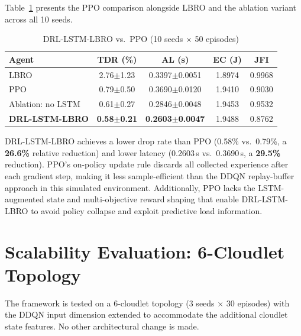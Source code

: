 Table~\ref{tab:ppo_vs_ddqn} presents the PPO comparison
alongside LBRO and the ablation variant across all 10 seeds.

\begin{table}[htbp]
\centering
\caption{DRL-LSTM-LBRO vs.\ PPO (10 seeds $\times$ 50 episodes)}
\label{tab:ppo_vs_ddqn}
\renewcommand{\arraystretch}{1.2}
\begin{tabular}{lcccc}
\toprule
\textbf{Agent} & \textbf{TDR (\%)} & \textbf{AL (s)}
  & \textbf{EC (J)} & \textbf{JFI} \\
\midrule
LBRO~\cite{nayyer2022lbro}
  & 2.76$\pm$1.23 & 0.3397$\pm$0.0051 & 1.8974 & 0.9968 \\
PPO~\cite{schulman2017ppo}
  & 0.79$\pm$0.50 & 0.3690$\pm$0.0120 & 1.9410 & 0.9030 \\
Ablation: no LSTM
  & 0.61$\pm$0.27 & 0.2846$\pm$0.0048 & 1.9453 & 0.9532 \\
\textbf{DRL-LSTM-LBRO}
  & \textbf{0.58$\pm$0.21} & \textbf{0.2603$\pm$0.0047} & 1.9488 & 0.8762 \\
\bottomrule
\end{tabular}
\end{table}

DRL-LSTM-LBRO achieves a lower drop rate than PPO
(0.58\% vs.\ 0.79\%, a \textbf{26.6\%} relative reduction)
and lower latency (0.2603\,s vs.\ 0.3690\,s, a \textbf{29.5\%}
reduction). PPO's on-policy update rule discards all collected
experience after each gradient step, making it less
sample-efficient than the DDQN replay-buffer approach in this
simulated environment. Additionally, PPO lacks the LSTM-augmented
state and multi-objective reward shaping that enable DRL-LSTM-LBRO
to avoid policy collapse and exploit predictive load information.

\section{Scalability Evaluation: 6-Cloudlet Topology}
\label{sec:scalability}

The framework is tested on a 6-cloudlet topology (3 seeds
$\times$ 30 episodes) with the DDQN input dimension extended
to accommodate the additional cloudlet state features. No
other architectural change is made.

